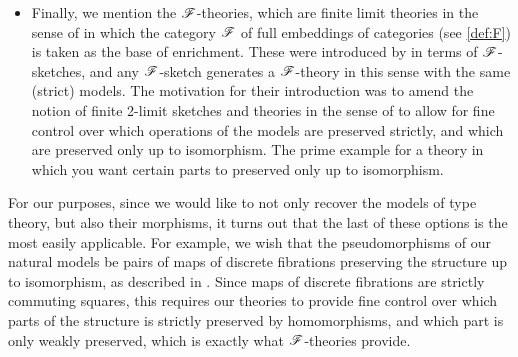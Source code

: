 \documentclass[../thesis.tex]{subfiles}
\begin{document}
\begin{itemize}

  \item Finally, we mention the ${\mathscr{F}}$-theories, which are finite limit theories in the sense of \cite{kelly1982a} in which
    the category ${\mathscr{F}}$ of full embeddings of categories (see \cref{def:F}) is taken as the base of enrichment. These were
    introduced by \textcite{arkor2024} in terms of ${\mathscr{F}}$-sketches, and any ${\mathscr{F}}$-sketch generates a ${\mathscr{F}}$-theory in this
    sense with the same (strict) models. The motivation for their introduction was to amend the notion of finite 2-limit
    sketches and theories in the sense of \cite{kelly1982a} to allow for fine control over which operations of the models
    are preserved strictly, and which are preserved only up to isomorphism. The prime example for a theory in which you
    want certain parts to preserved only up to isomorphism.
\end{itemize}

For our purposes, since we would like to not only recover the models of type theory, but also their morphisms, it turns out
that the last of these options is the most easily applicable. For example, we wish that the pseudomorphisms of our natural
models be pairs of maps of discrete fibrations preserving the structure up to isomorphism, as described in \cite[Chapter 2]
{newstead2021}. Since maps of discrete fibrations are strictly commuting squares, this requires our theories to provide
fine control over which parts of the structure is strictly preserved by homomorphisms, and which part is only weakly
preserved, which is exactly what ${\mathscr{F}}$-theories provide.
\end{document}
